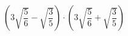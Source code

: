 \begin{ex}[type=expression]
	\begin{condition}
		\( \left( 3\sqrt{\dfrac{5}{6}}-\sqrt{\dfrac{3}{5}} \right)\cdot\left(  3\sqrt{\dfrac{5}{6}}+\sqrt{\dfrac{3}{5}}\right) \)
	\end{condition}
\end{ex}